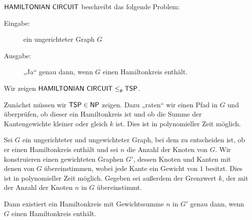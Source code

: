 \begin{enumerate}
\begin{enumerate}
        $\textsf{HAMILTONIAN CIRCUIT}$ beschreibt das folgende Problem:
        \begin{description}
          \item[Eingabe:] ein ungerichteter Graph $G$
          \item[Ausgabe:] „Ja“ genau dann, wenn $G$ einen Hamiltonkreis enthält.
        \end{description}

        Wir zeigen $\textsf{HAMILTONIAN CIRCUIT} \leq_{\textsf{p}} \textsf{TSP}$.

        Zunächst müssen wir $\textsf{TSP} \in \textsf{NP}$ zeigen. Dazu „raten“ wir einen Pfad
        in $G$ und überprüfen, ob dieser ein Hamiltonkreis ist und ob die Summe
        der Kantengewichte kleiner oder gleich $k$ ist. Dies ist in
        polynomieller Zeit möglich.

        Sei $G$ ein ungerichteter und ungewichteter Graph, bei dem zu
        entscheiden ist, ob er einen Hamiltonkreis enthält und sei $n$ die
        Anzahl der Knoten von $G$. Wir konstruieren einen gewichteten Graphen
        $G'$, dessen Knoten und Kanten mit denen von $G$ übereinstimmen, wobei
        jede Kante ein Gewicht von $1$ besitzt. Dies ist in polynomieller Zeit
        möglich. Gegeben sei außerdem der Grenzwert $k$, der mit der Anzahl der
        Knoten $n$ in $G$ übereinstimmt.

        Dann existiert ein Hamiltonkreis mit Gewichtssumme $n$ in $G'$ genau
        dann, wenn $G$ einen Hamiltonkreis enthält.
  \end{enumerate}
\end{enumerate}

